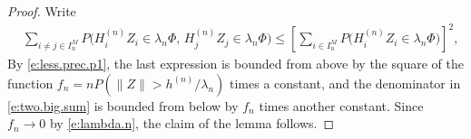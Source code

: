 \documentclass[11pt,reqno]{amsart}
\numberwithin{equation}{section}
\theoremstyle{definition}
\theoremstyle{remark}
\theoremstyle{definition}
\begin{document}
\begin{proof}
 Write
    \begin{align*}
       & \sum_{i \neq j\in I_n^M }P\bigl(H_i^{(n)} Z_i \in \lambda_n \Phi, \, H_j^{(n)}
         Z_j \in \lambda_n \Phi\bigr) \leq \left[\sum_{i  \in I_n^M }P\bigl(H_i^{(n)} Z_i
         \in \lambda_n \Phi\bigr)\right]^2, 
    \end{align*}
    By \eqref{e:less.prec.p1}, the last expression is bounded from
    above by the square of the function $f_n=nP(\|Z\|>
    h^{(n)}/\lambda_n)$ times a constant, and the
denominator in \eqref{e:two.big.sum} is bounded from below by $f_n$
times another constant. Since $f_n\to 0$ by \eqref{e:lambda.n}, the
claim of the lemma follows. 

\end{proof}
\end{document}
